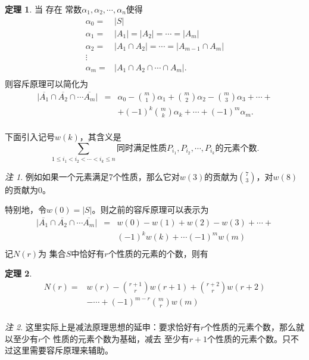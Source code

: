 \documentclass[a4paper,11pt]{article}%
\theoremstyle{remark}
\newtheorem*{remark}{注}
\theoremstyle{remark}
\theoremstyle{definition}
\newtheorem{theorem}{定理}[section]
\theoremstyle{definition}
\theoremstyle{definition}
\newcommand*{\abs}[1]{\lvert #1 \rvert}
\begin{document}
\begin{theorem}
    当 存在 常数$\alpha_1,\alpha_2,\cdots,\alpha_n$使得 
    \[ 
        \begin{array}{rl}
            \alpha_0=&\abs{S}\\
            \alpha_1=&\abs{A_1}=\abs{A_2}=\cdots =\abs{A_m}\\
            \alpha_2=&\abs{A_1\cap A_2}=\cdots =\abs{A_{m-1}\cap A_m}\\
            \vdots &\\
            \alpha_m =&\abs{A_1\cap A_2\cap \cdots \cap A_m}.\\
        \end{array}\]
        则容斥原理可以简化为
    \[\begin{array}{rcl}
    \abs{\overline{A_1}\cap\overline{A_2}\cap\cdots\overline{A_m}}&=&\alpha_0-\binom{m}{1}\alpha_1+\binom{m}{2}\alpha_2-\binom{m}{3}\alpha_3+\cdots +\\
    &&+(-1)^k\binom{m}{k}\alpha_k+\cdots+(-1)^m\alpha_m.\\
    \end{array}\]
\end{theorem}
下面引入记号$w(k)$，其含义是
\[\sum_{1\leq i_1<i_2<\cdots<i_k\leq n}\text{同时满足性质} P_{i_1},P_{i_2},\cdots,P_{i_k}\text{的元素个数}.\]
\begin{remark}
    例如如果一个元素满足7个性质，那么它对$w(3)$的贡献为$\binom{7}{3}$，对$w(8)$的贡献为0。
\end{remark}
特别地，令$w(0)=\abs{S}$。则之前的容斥原理可以表示为
    \[\begin{array}{rcl}
    \abs{\overline{A_1}\cap\overline{A_2}\cap\cdots\overline{A_m}}&=&w(0)-w(1)+w(2)-w(3)+\cdots+\\
    &&(-1)^kw(k)+\cdots (-1)^mw(m)\\
    \end{array}\]
记$N(r)$为 集合$S$中恰好有$r$个性质的元素的个数，则有
\begin{theorem}
    \[ 
        \begin{array}{rl}
            N(r) = &w(r)-\binom{r+1}{r}w(r+1)+\binom{r+2}{r}w(r+2)\\
            &-\cdots + (-1)^{m-r}\binom{m}{r}w(m)\\
        \end{array}\]
\end{theorem}
\begin{remark}
    这里实际上是减法原理思想的延申：要求恰好有$r$个性质的元素个数，那么就以至少有$r$个
    性质的元素个数为基础，减去 至少有$r+1$个性质的元素个数。只不过这里需要容斥原理来辅助。
\end{remark}
\end{document}
